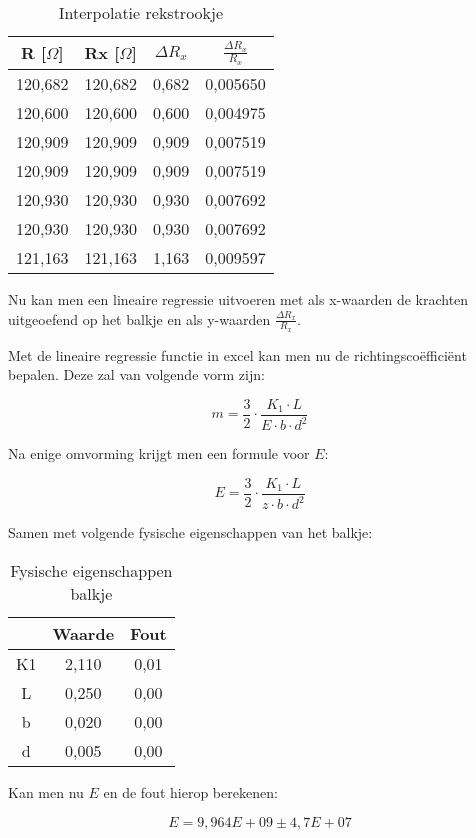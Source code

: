 \begin{table}[h]
    \centering
    \caption{Interpolatie rekstrookje}
    \label{tab:interpol_rekstrookje}
    \begin{tabular}{| c | c | c | c |}
        \hline
        R [$\Omega$]    & Rx [$\Omega$] & $\Delta R_{x}$    & $\frac{\Delta R_{x}}{R_{x}}$ \\ \hline
        120,682         & 120,682       & 0,682             & 0,005650 \\ \hline
        120,600         & 120,600       & 0,600             & 0,004975 \\ \hline
        120,909         & 120,909       & 0,909             & 0,007519 \\ \hline
        120,909         & 120,909       & 0,909             & 0,007519 \\ \hline
        120,930         & 120,930       & 0,930             & 0,007692 \\ \hline
        120,930         & 120,930       & 0,930             & 0,007692 \\ \hline
        121,163         & 121,163       & 1,163             & 0,009597 \\ \hline
    \end{tabular}
\end{table}

Nu kan men een lineaire regressie uitvoeren met als x-waarden
de krachten uitgeoefend op het balkje en als y-waarden
$\frac{\Delta R_{x}}{R_{x}}$.

Met de lineaire regressie functie in excel kan men nu de
richtingsco\"effici\"ent bepalen. Deze zal van volgende vorm
zijn:

\begin{equation}
    m = \frac{3}{2} \cdot \frac{K_1 \cdot L}{E \cdot b \cdot d^2}
\end{equation}

Na enige omvorming krijgt men een formule voor $E$:

\begin{equation}
    E = \frac{3}{2} \cdot \frac{K_1 \cdot L}{z \cdot b \cdot d^2}
\end{equation}

Samen met volgende fysische eigenschappen van het balkje:

\begin{table}[h]
    \centering
    \caption{Fysische eigenschappen balkje}
    \label{tab:fys_eig_balkje}
    \begin{tabular}{| c | c | c |}
        \hline
            & Waarde& Fout \\ \hline
        K1  & 2,110 & 0,01 \\ \hline
        L   & 0,250 & 0,00 \\ \hline
        b   & 0,020 & 0,00 \\ \hline
        d   & 0,005 & 0,00 \\ \hline
    \end{tabular}
\end{table}

Kan men nu $E$ en de fout hierop berekenen:

\begin{equation}
    E = 9,964E+09 \pm 4,7E+07
\end{equation}
